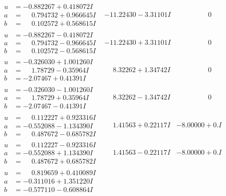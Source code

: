 \documentclass[1p]{elsarticle_modified}
\theoremstyle{definition}
\begin{document}
$$\begin{array}{c|c|c}
\begin{aligned}
u &= -0.882267 + 0.418072 I \\
a &= \phantom{-}0.794732 + 0.966645 I \\
b &= \phantom{-}0.102572 + 0.568615 I\end{aligned}
 & -11.22430 - 3.31101 I & \phantom{-0.000000 } 0 \\ \hline\begin{aligned}
u &= -0.882267 - 0.418072 I \\
a &= \phantom{-}0.794732 - 0.966645 I \\
b &= \phantom{-}0.102572 - 0.568615 I\end{aligned}
 & -11.22430 + 3.31101 I & \phantom{-0.000000 } 0 \\ \hline\begin{aligned}
u &= -0.326030 + 1.001260 I \\
a &= \phantom{-}1.78729 - 0.35964 I \\
b &= -2.07467 + 0.41391 I\end{aligned}
 & \phantom{-}8.32262 + 1.34742 I & \phantom{-0.000000 } 0 \\ \hline\begin{aligned}
u &= -0.326030 - 1.001260 I \\
a &= \phantom{-}1.78729 + 0.35964 I \\
b &= -2.07467 - 0.41391 I\end{aligned}
 & \phantom{-}8.32262 - 1.34742 I & \phantom{-0.000000 } 0 \\ \hline\begin{aligned}
u &= \phantom{-}0.112227 + 0.923316 I \\
a &= -0.552088 - 1.134390 I \\
b &= \phantom{-}0.487672 - 0.685782 I\end{aligned}
 & \phantom{-}1.41563 + 0.22117 I & -8.00000 + 0. I\phantom{ +0.000000I} \\ \hline\begin{aligned}
u &= \phantom{-}0.112227 - 0.923316 I \\
a &= -0.552088 + 1.134390 I \\
b &= \phantom{-}0.487672 + 0.685782 I\end{aligned}
 & \phantom{-}1.41563 - 0.22117 I & -8.00000 + 0. I\phantom{ +0.000000I} \\ \hline\begin{aligned}
u &= \phantom{-}0.819659 + 0.410089 I \\
a &= -0.311016 + 1.351220 I \\
b &= -0.577110 - 0.608864 I\end{aligned}

\end{array}$$
\end{document}
